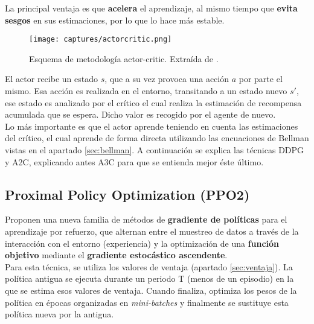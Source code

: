 \documentclass[11pt,fleqn]{book} %
\begin{document}
La principal ventaja es que \textbf{acelera} el aprendizaje, al mismo tiempo que \textbf{evita sesgos} en sus estimaciones, por lo que lo hace más estable.

\begin{figure}[H]
	\centering\texttt{[image: captures/actorcritic.png]}
	\caption{Esquema de metodología actor-critic. Extraída de \cite{article:RLromero}.}
	\label{fig:actorcritic} %
\end{figure}

El actor recibe un estado $s$, que a su vez provoca una acción $a$ por parte el mismo. Esa acción es realizada en el entorno, transitando a un estado nuevo $s'$, ese estado es analizado por el crítico el cual realiza la estimación de recompensa acumulada que se espera. Dicho valor es recogido por el agente de nuevo. \\

Lo más importante es que el actor aprende teniendo en cuenta las estimaciones del crítico, el cual aprende de forma directa utilizando las encuaciones de Bellman vistas en el apartado \ref{sec:bellman}. A continuación se explica las técnicas DDPG y A2C, explicando antes A3C para que se entienda mejor éste último.\\

\subsection{Proximal Policy Optimization (PPO2)}

Proponen una nueva familia de métodos de \textbf{gradiente de políticas} \cite{article:PPO2} \cite{article:PPO2_1} para el aprendizaje por refuerzo, que alternan entre el muestreo de datos a través de la interacción con el entorno (experiencia) y la optimización de una \textbf{función objetivo} mediante el \textbf{gradiente estocástico ascendente}. \\

Para esta técnica, se utiliza los valores de ventaja (apartado \ref{sec:ventaja}). La política antigua se ejecuta durante un periodo T (menos de un episodio) en la que se estima esos valores de ventaja. Cuando finaliza, optimiza los pesos de la política en épocas organizadas en \textit{mini-batches} y finalmente se sustituye esta política nueva por la antigua. \\
\end{document}
